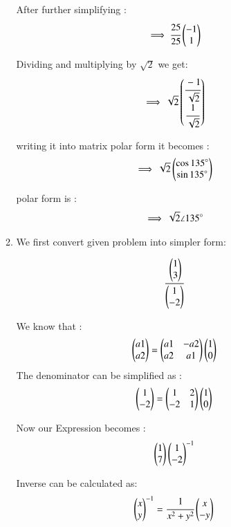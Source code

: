 \begin{enumerate}[label=\thesection.\arabic*.,ref=\thesection.\theenumi]
\begin{enumerate}
After further simplifying :
\begin{align}
    \implies \cfrac{25 }{25}\begin{pmatrix}-1 \\ 1\end{pmatrix}
\end{align}

Dividing and multiplying by $\sqrt{2}$ we get:
\begin{align}
    \implies \sqrt{2}\begin{pmatrix}\cfrac{-1}{\sqrt{2}} \\ \cfrac{1}{\sqrt{2}}\end{pmatrix}
\end{align}

writing it into matrix polar form it becomes :
\begin{align}
    \implies \sqrt{2}\begin{pmatrix}\cos{135}\degree \\ \sin{135}\degree\end{pmatrix}
\end{align}

polar form is :
\begin{align}
    \implies \sqrt{2} \angle 135 \degree
\end{align}



\item We first convert given problem into simpler form:

\begin{align}
    \cfrac{\begin{pmatrix}1 \\ 3\end{pmatrix}}{\begin{pmatrix}1 \\ -2\end{pmatrix}}
\end{align} 

We know that :
\begin{align}
    \begin{pmatrix}a1 \\ a2\end{pmatrix} = \begin{pmatrix}a1 & -a2\\a2 & a1\end{pmatrix}\begin{pmatrix}1 \\ 0\end{pmatrix}
\end{align}
The denominator can be simplified as :
\begin{align}
    \begin{pmatrix}1 \\ -2\end{pmatrix} = \begin{pmatrix}1 & 2\\-2 & 1\end{pmatrix}\begin{pmatrix}1 \\ 0\end{pmatrix}
\end{align}

Now our Expression becomes :
\begin{align}
    \begin{pmatrix}1 \\ 7\end{pmatrix}\begin{pmatrix}1\\-2\end{pmatrix}^{-1}
\end{align}

Inverse can be calculated as:
\begin{align}
    \begin{pmatrix}x \\ y\end{pmatrix}^{-1}=\cfrac{1}{x^2+y^2}\begin{pmatrix}x\\-y\end{pmatrix}
\end{align}


\end{enumerate}
\end{enumerate}

